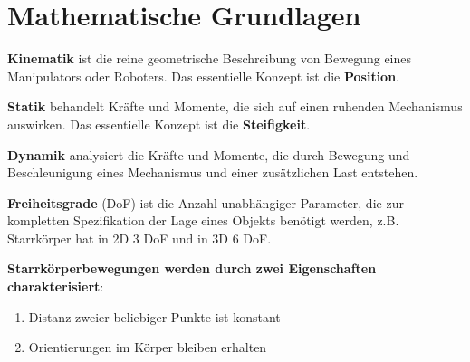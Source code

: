 \section{Mathematische Grundlagen}

\textbf{Kinematik} ist die reine geometrische Beschreibung von Bewegung eines Manipulators
oder Roboters. Das essentielle Konzept ist die \textbf{Position}.

\textbf{Statik} behandelt Kräfte und Momente, die sich auf einen ruhenden Mechanismus
auswirken. Das essentielle Konzept ist die \textbf{Steifigkeit}.

\textbf{Dynamik} analysiert die Kräfte und Momente, die durch Bewegung und Beschleunigung
eines Mechanismus und einer zusätzlichen Last entstehen.

\textbf{Freiheitsgrade} (DoF) ist die Anzahl unabhängiger Parameter, die zur kompletten Spezifikation der Lage eines Objekts benötigt werden, z.B. Starrkörper hat in 2D 3 DoF und in 3D 6 DoF.

\textbf{Starrkörperbewegungen werden durch zwei Eigenschaften charakterisiert}:
\begin{enumerate}
	\item Distanz zweier beliebiger Punkte ist konstant
	\item Orientierungen im Körper bleiben erhalten
\end{enumerate}

